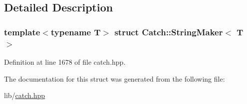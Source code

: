 \subsection{Detailed Description}
\subsubsection*{template$<$typename T$>$\newline
struct Catch\+::\+String\+Maker$<$ T $>$}



Definition at line 1678 of file catch.\+hpp.



The documentation for this struct was generated from the following file\+:\begin{DoxyCompactItemize}
\item 
lib/\hyperlink{catch_8hpp}{catch.\+hpp}\end{DoxyCompactItemize}
